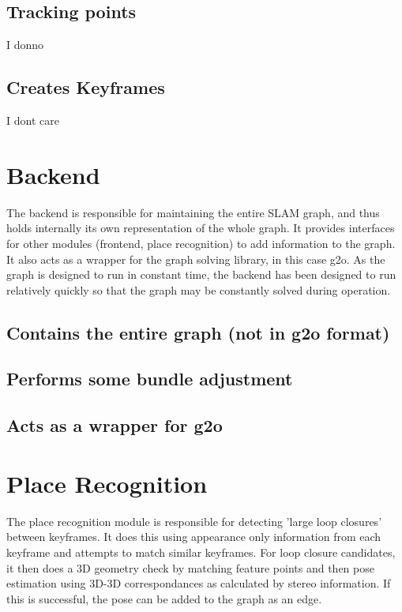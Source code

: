 \subsection{Tracking points}

I donno

\subsection{Creates Keyframes}

I dont care

\section{Backend}
\label{sec:scavislam_backend}

The backend is responsible for maintaining the entire SLAM graph, and thus holds internally its
own representation of the whole graph.  It provides interfaces for other modules (frontend, place
recognition) to add information to the graph. It also acts as a wrapper for the graph solving
library, in this case g2o. As the graph is designed to run in constant time, the backend has been
designed to run relatively quickly so that the graph may be constantly solved during operation.

\subsection{Contains the entire graph (not in g2o format)}
\subsection{Performs some bundle adjustment}
\subsection{Acts as a wrapper for g2o}

\section{Place Recognition}
\label{sec:scavislam_place_recog}

The place recognition module is responsible for detecting 'large loop closures' between keyframes. 
It does this using appearance only information from each keyframe and attempts to match similar
keyframes.  For loop closure candidates, it then does a 3D geometry check by matching feature
points and then pose estimation using 3D-3D correspondances as calculated by stereo information. 
If this is successful, the pose can be added to the graph as an edge.

